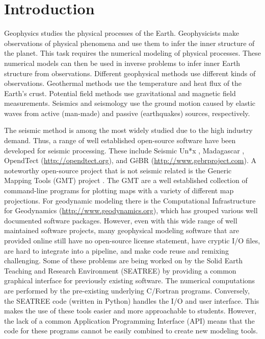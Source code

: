 \section{Introduction}

Geophysics studies the physical processes of the Earth. Geophysicists make
observations of physical phenomena and use them to infer the inner structure of
the planet. This task requires the numerical modeling of physical processes.
These numerical models can then be used in inverse problems to infer inner
Earth structure from observations. Different geophysical methods use different
kinds of observations. Geothermal methods use the temperature and heat flux of
the Earth's crust.  Potential field methods use gravitational and magnetic
field measurements. Seismics and seismology use the ground motion caused by
elastic waves from active (man-made) and passive (earthquakes) sources,
respectively.

The seismic method is among the most widely studied due to the high industry
demand. Thus, a range of well established open-source software have been
developed for seismic processing. These include Seismic Un*x \citep[][
\url{http://www.cwp.mines.edu/cwpcodes/}]{stockwelljr.1999}, Madagascar
\citep[][ \url{http://www.ahay.org/}]{madagascardevelopmentteam2013}, OpendTect
(\url{http://opendtect.org}), and GêBR (\url{http://www.gebrproject.com}). A
noteworthy open-source project that is not seismic related is the Generic
Mapping Tools (GMT) project \citep[][
\url{http://gmt.soest.hawaii.edu/}]{wessel1991}. The GMT are a well established
collection of command-line programs for plotting maps with a variety of
different map projections.  For geodynamic modeling there is the Computational
Infrastructure for Geodynamics (\url{http://www.geodynamics.org}), which has
grouped various well documented software packages. However, even with this wide
range of well maintained software projects, many geophysical modeling software
that are provided online still have no open-source license statement, have
cryptic I/O files, are hard to integrate into a pipeline, and make code reuse
and remixing challenging. Some of these problems are being worked on by the
Solid Earth Teaching and Research Environment (SEATREE) \citep[][
\url{http://geosys.usc.edu/projects/seatree/}]{milner2009} by providing a
common graphical interface for previously existing software. The numerical
computations are performed by the pre-existing underlying C/Fortran programs.
Conversely, the SEATREE code (written in Python) handles the I/O and user
interface. This makes the use of these tools easier and more approachable to
students. However, the lack of a common Application Programming Interface (API)
means that the code for these programs cannot be easily combined to create new
modeling tools.

